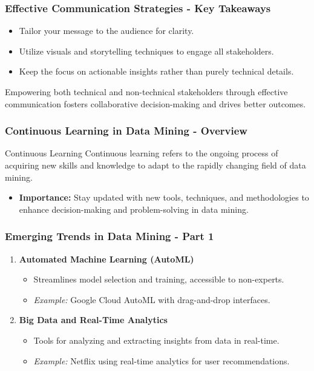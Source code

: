 \documentclass{beamer}
\begin{document}
\begin{frame}[fragile]
    \frametitle{Effective Communication Strategies - Key Takeaways}
    \begin{itemize}
        \item Tailor your message to the audience for clarity.
        \item Utilize visuals and storytelling techniques to engage all stakeholders.
        \item Keep the focus on actionable insights rather than purely technical details.
    \end{itemize}
    Empowering both technical and non-technical stakeholders through effective communication fosters collaborative decision-making and drives better outcomes.
\end{frame}

\begin{frame}[fragile]
    \frametitle{Continuous Learning in Data Mining - Overview}
    \begin{block}{Continuous Learning}
        Continuous learning refers to the ongoing process of acquiring new skills and knowledge to adapt to the rapidly changing field of data mining.
    \end{block}
    \begin{itemize}
        \item \textbf{Importance:} Stay updated with new tools, techniques, and methodologies to enhance decision-making and problem-solving in data mining.
    \end{itemize}
\end{frame}

\begin{frame}[fragile]
    \frametitle{Emerging Trends in Data Mining - Part 1}
    \begin{enumerate}
        \item \textbf{Automated Machine Learning (AutoML)}
            \begin{itemize}
                \item Streamlines model selection and training, accessible to non-experts.
                \item \textit{Example:} Google Cloud AutoML with drag-and-drop interfaces.
            \end{itemize}
        
        \item \textbf{Big Data and Real-Time Analytics}
            \begin{itemize}
                \item Tools for analyzing and extracting insights from data in real-time.
                \item \textit{Example:} Netflix using real-time analytics for user recommendations.
            \end{itemize}
    \end{enumerate}  
\end{frame}
\end{document}
